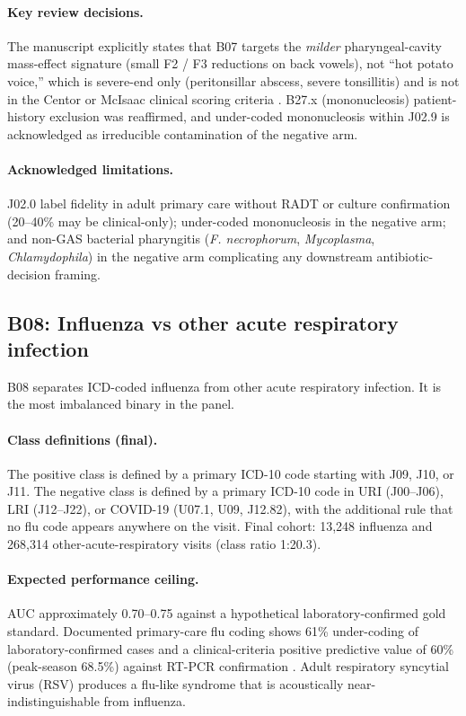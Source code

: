 \documentclass[utf8]{frontiers_suppmat} %
\begin{document}
\paragraph{Key review decisions.} The manuscript explicitly states
that B07 targets the \emph{milder} pharyngeal-cavity mass-effect
signature (small F2 / F3 reductions on back vowels), not ``hot potato
voice,'' which is severe-end only (peritonsillar abscess, severe
tonsillitis) and is not in the Centor or McIsaac clinical scoring
criteria \citep{centor-1981, mcisaac-1998}. B27.x (mononucleosis)
patient-history exclusion was reaffirmed, and under-coded mononucleosis
within J02.9 is acknowledged as irreducible contamination of the
negative arm.

\paragraph{Acknowledged limitations.} J02.0 label fidelity in adult
primary care without RADT or culture confirmation (20--40\% may be
clinical-only); under-coded mononucleosis in the negative arm; and
non-GAS bacterial pharyngitis (\textit{F. necrophorum},
\textit{Mycoplasma}, \textit{Chlamydophila}) in the negative arm
complicating any downstream antibiotic-decision framing.

\subsection{B08: Influenza vs other acute respiratory infection}
\label{sec:supp-b08}

B08 separates ICD-coded influenza from other acute respiratory
infection. It is the most imbalanced binary in the panel.

\paragraph{Class definitions (final).} The positive class is defined
by a primary ICD-10 code starting with J09, J10, or J11. The negative
class is defined by a primary ICD-10 code in URI (J00--J06), LRI
(J12--J22), or COVID-19 (U07.1, U09, J12.82), with the
additional rule that no flu code appears anywhere on the visit. Final
cohort: 13{,}248 influenza and 268{,}314 other-acute-respiratory
visits (class ratio 1:20.3).

\paragraph{Expected performance ceiling.} AUC approximately
0.70--0.75 against a hypothetical laboratory-confirmed gold standard.
Documented primary-care flu coding shows 61\% under-coding of
laboratory-confirmed cases and a clinical-criteria positive predictive
value of 60\% (peak-season 68.5\%) against RT-PCR confirmation \citep{flu-primary-care-coding-fidelity}. Adult
respiratory syncytial virus (RSV) produces a flu-like syndrome that
is acoustically near-indistinguishable from influenza.
\end{document}
